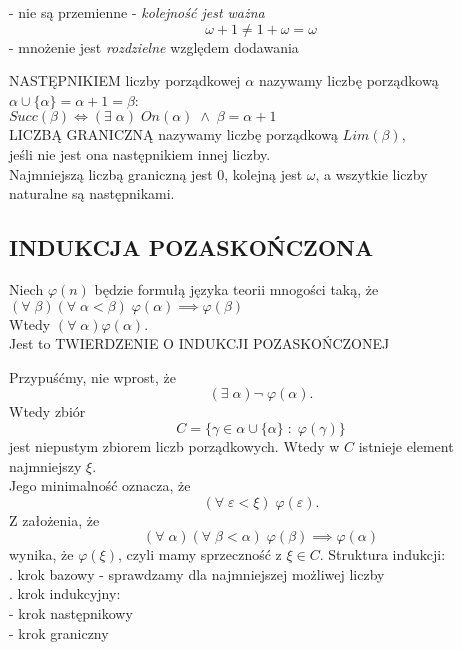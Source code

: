 \indent - nie są przemienne - \emph{kolejność jest ważna}
$$\omega+1\neq1+\omega=\omega$$
\indent - mnożenie jest \emph{rozdzielne }względem dodawania\medskip\\
\medskip
\begin{center}\large
    {\color{def}NASTĘPNIKIEM }liczby porządkowej $\alpha$ nazywamy liczbę porządkową $\alpha\cup\{\alpha\}=\alpha+1=\beta$:\smallskip\\
    $Succ(\beta)\iff(\exists\;\alpha)\;On(\alpha)\;\land\;\beta=\alpha+1$\medskip\\
    {\color{def}LICZBĄ GRANICZNĄ} nazywamy liczbę porządkową $Lim(\beta)$, \\jeśli nie jest ona następnikiem innej liczby.\medskip\\
    \normalsize Najmniejszą liczbą graniczną jest 0, kolejną jest $\omega$, a wszytkie liczby \\naturalne są następnikami.
\end{center}

\subsection{INDUKCJA POZASKOŃCZONA}
\begin{center}\large
    Niech $\varphi(n)$ będzie formułą języka teorii mnogości taką, że\smallskip\\
    $(\forall\;\beta)(\forall\;\alpha<\beta)\;\varphi(\alpha)\implies\varphi(\beta)$\smallskip\\
    Wtedy $(\forall\;\alpha)\varphi(\alpha)$.\medskip\\
    Jest to {\color{def}TWIERDZENIE O INDUKCJI POZASKOŃCZONEJ}
\end{center}
\dowod
Przypuśćmy, nie wprost, że
$$(\exists\;\alpha)\neg\;\varphi(\alpha).$$
Wtedy zbiór
$$C=\{\gamma\in\alpha\cup\{\alpha\}\;:\;\varphi(\gamma)\}$$
jest niepustym zbiorem liczb porządkowych. Wtedy w $C$ istnieje element najmniejszy $\xi$. \\Jego minimalność oznacza, że
$$(\forall\;\varepsilon<\xi)\;\varphi(\varepsilon).$$
Z założenia, że
$$(\forall\;\alpha)(\forall\;\beta<\alpha)\;\varphi(\beta)\implies\varphi(\alpha)$$
wynika, że $\varphi(\xi)$, czyli mamy sprzeczność z $\xi\in C$.
\kondow
{\color{def}Struktura indukcji}:\medskip\\
. krok bazowy - sprawdzamy dla najmniejszej możliwej liczby\smallskip\\
. krok indukcyjny:\smallskip\\
\indent\indent - krok następnikowy\smallskip\\
\indent\indent - krok graniczny

